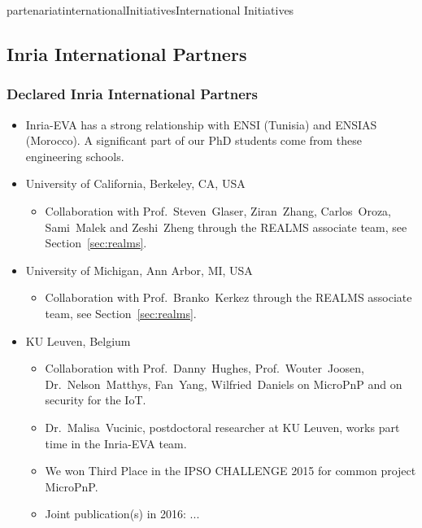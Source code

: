 \documentclass{ra2016}
\begin{document}
\begin{module}{partenariat}{internationalInitiatives}{International Initiatives}
\subsection{Inria International Partners}


\subsubsection{Declared Inria International Partners}

\begin{itemize}
    \item Inria-EVA has a strong relationship with ENSI (Tunisia) and ENSIAS (Morocco).
        A significant part of our PhD students come from these engineering schools. 
    \item University of California, Berkeley, CA, USA
        \begin{itemize}
            \item Collaboration with Prof.~Steven~Glaser, Ziran~Zhang, Carlos~Oroza, Sami~Malek and Zeshi~Zheng through the REALMS associate team, see Section~\ref{sec:realms}.
        \end{itemize}
    \item University of Michigan, Ann Arbor, MI, USA
        \begin{itemize}
            \item Collaboration with Prof.~Branko~Kerkez through the REALMS associate team, see Section~\ref{sec:realms}.
        \end{itemize}
    \item KU Leuven, Belgium
        \begin{itemize}
            \item Collaboration with Prof.~Danny~Hughes, Prof.~Wouter~Joosen, Dr.~Nelson~Matthys, Fan~Yang, Wilfried~Daniels on MicroPnP and on security for the IoT.
            \item Dr.~Malisa~Vucinic, postdoctoral researcher at KU Leuven, works part time in the Inria-EVA team.
            \item We won Third Place in the IPSO CHALLENGE 2015 for common project MicroPnP.
            \item Joint publication(s) in 2016: ... 

\end{itemize}
\end{itemize}
\end{module}
\end{document}
